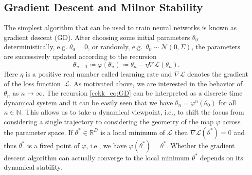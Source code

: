 \documentclass[10pt]{article}
\begin{document}
\subsection{Gradient Descent and Milnor Stability}\label{cekk_subs:GDStab}

The simplest algorithm that can be used to train neural networks is known as gradient descent (GD). After choosing some initial parameters $\theta_0$ deterministically, e.g. \mbox{$\theta_0=0$}, or randomly, e.g.~$\theta_0 \sim \mathcal N(0,\Sigma)$, the parameters are successively updated according to the recursion
\begin{equation}\label{cekk_eq:GD}
	\theta_{n+1} \coloneqq \varphi(\theta_n) \coloneqq \theta_n - \eta \nabla \mathcal L(\theta_n).
\end{equation}
Here $\eta$ is a positive real number called learning rate and $\nabla \mathcal L$ denotes the gradient of the loss function~$\mathcal L$. As motivated above, we are interested in the behavior of~$\theta_n$ as $n\to \infty$. The recursion \eqref{cekk_eq:GD} can be interpreted as a discrete time dynamical system and it can be easily seen that we have $\theta_n = \varphi^n(\theta_0)$ for all $n\in \mathbb N$. This allows us to take a dynamical viewpoint, i.e., to shift the focus from considering a single trajectory to considering the geometry of the map $\varphi$ across the parameter space.
If $\theta^* \in \mathbb R^D$ is a local minimum of $\mathcal L$ then $\nabla \mathcal L(\theta^*) = 0$ and thus $\theta^*$ is a fixed point of $\varphi$, i.e., we have $\varphi(\theta^*) = \theta^*$. Whether the gradient descent algorithm can actually converge to the local minimum $\theta^*$ depends on its dynamical stability. 
\end{document}
